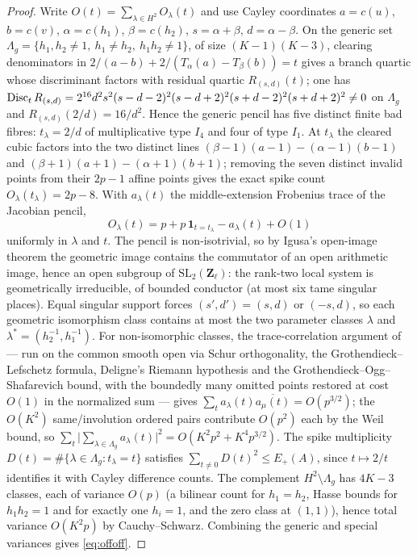 \begin{proof}
Write $O(t)=\sum_{\lambda\in H^2}O_\lambda(t)$ and use Cayley
coordinates $a=c(u)$, $b=c(v)$, $\alpha=c(h_1)$, $\beta=c(h_2)$,
$s=\alpha+\beta$, $d=\alpha-\beta$.  On the generic set
$\Lambda_g=\{h_1,h_2\ne1,\ h_1\ne h_2,\ h_1h_2\ne1\}$, of size
$(K-1)(K-3)$, clearing denominators in
$2/(a-b)+2/(T_\alpha(a)-T_\beta(b))=t$ gives a branch quartic whose
discriminant factors with residual quartic $R_{(s,d)}(t)$; one has
$\operatorname{Disc}_tR_{(s,d)}
 =2^{16}d^2s^2(s-d-2)^2(s-d+2)^2(s+d-2)^2(s+d+2)^2\ne0$
on $\Lambda_g$ and $R_{(s,d)}(2/d)=16/d^2$.  Hence the generic
pencil has five distinct finite bad fibres: $t_\lambda=2/d$ of
multiplicative type $I_4$ and four of type $I_1$.  At $t_\lambda$
the cleared cubic factors into the two distinct lines
$(\beta-1)(a-1)-(\alpha-1)(b-1)$ and
$(\beta+1)(a+1)-(\alpha+1)(b+1)$; removing the seven distinct
invalid points from their $2p-1$ affine points gives the exact
spike count $O_\lambda(t_\lambda)=2p-8$.  With $a_\lambda(t)$ the
middle-extension Frobenius trace of the Jacobian pencil,
\[
O_\lambda(t)
 =p+p\,\mathbf 1_{t=t_\lambda}-a_\lambda(t)+O(1)
\]
uniformly in $\lambda$ and $t$.  The pencil is non-isotrivial, so
by Igusa's open-image theorem \cite{BLV2009} the geometric image
contains the commutator of an open arithmetic image, hence an open
subgroup of $\mathrm{SL}_2(\mathbf Z_\ell)$: the rank-two local
system is geometrically irreducible, of bounded conductor (at most
six tame singular places).  Equal singular support forces
$(s',d')=(s,d)$ or $(-s,d)$, so each geometric isomorphism class
contains at most the two parameter classes $\lambda$ and
$\lambda^\ast=(h_2^{-1},h_1^{-1})$.  For non-isomorphic classes,
the trace-correlation argument of \cite{FKM2013} --- run on the
common smooth open via Schur orthogonality, the
Grothendieck--Lefschetz formula, Deligne's Riemann hypothesis and
the Grothendieck--Ogg--Shafarevich bound, with the boundedly many
omitted points restored at cost $O(1)$ in the normalized sum ---
gives $\sum_t a_\lambda(t)\overline{a_\mu(t)}=O(p^{3/2})$; the
$O(K^2)$ same/involution ordered pairs contribute $O(p^2)$ each by
the Weil bound, so
$\sum_t\bigl|\sum_{\lambda\in\Lambda_g}a_\lambda(t)\bigr|^2
 =O(K^2p^2+K^4p^{3/2})$.
The spike multiplicity $D(t)=\#\{\lambda\in\Lambda_g:
t_\lambda=t\}$ satisfies $\sum_{t\ne0}D(t)^2\le E_+(A)$, since
$t\mapsto2/t$ identifies it with Cayley difference counts.  The
complement $H^2\setminus\Lambda_g$ has $4K-3$ classes, each of
variance $O(p)$ (a bilinear count for $h_1=h_2$, Hasse bounds for
$h_1h_2=1$ and for exactly one $h_i=1$, and the zero class at
$(1,1)$), hence total variance $O(K^2p)$ by Cauchy--Schwarz.
Combining the generic and special variances gives
\eqref{eq:offoff}.
\end{proof}

